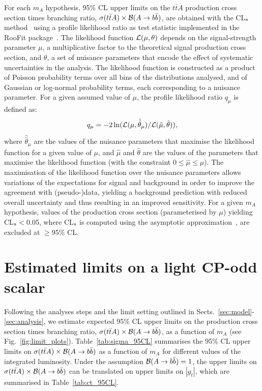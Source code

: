 \documentclass[preprintnumbers,superscriptaddress,nofootinbib,aps,prd,floatfix]{revtex4}
\newcommand{\ttbar}{\ensuremath{t\bar{t}}}
\begin{document}
For each $m_A$ hypothesis, 95\% CL upper limits on the $\ttbar A$ production cross section times branching ratio, 
$\sigma(\ttbar A) \times {\cal B}(A \to b\bar{b})$, are obtained with the CL$_{\rm{s}}$ method~\cite{Junk:1999kv,Read:2002hq} 
using a profile likelihood ratio as test statistic implemented in the {\sc RooFit} package~\cite{Verkerke:2003ir,RooFitManual}. 
The likelihood function ${\cal L}(\mu,\theta)$ depends on 
the signal-strength parameter $\mu$,  a multiplicative factor to the theoretical signal production cross section,
and $\theta$, a set of nuisance parameters that encode the effect of systematic uncertainties in the analysis.
The likelihood function is constructed as a product of Poisson probability terms over all bins of the distributions analysed, 
and of Gaussian or log-normal probability terms, each corresponding to a nuisance parameter. 
For a given assumed value of $\mu$, the profile likelihood ratio $q_\mu$ is defined as:
\begin{equation}
q_\mu = -2\ln({\cal L}(\mu,\hat{\hat{\theta}}_\mu)/{\cal L}(\hat{\mu},\hat{\theta})), 
\end{equation}
where $\hat{\hat{\theta}}_\mu$ are the values of the nuisance parameters that maximise the likelihood 
function for a given value of $\mu$, and $\hat{\mu}$ and $\hat{\theta}$ are the values of the parameters 
that maximise the likelihood function (with the constraint $0\leq \hat{\mu} \leq \mu$).
The maximisation of the likelihood function over the nuisance parameters allows variations of the expectations 
for signal and background in order to improve the agreement with (pseudo-)data, yielding a
background prediction with reduced overall uncertainty and thus resulting in an improved sensitivity.
For a given $m_A$ hypothesis, values of the production cross section (parameterised by $\mu$) yielding 
CL$_{\rm{s}}$$<$0.05, where CL$_{\rm{s}}$ is computed using the asymptotic 
approximation~\cite{Cowan:2010js}, are excluded at $\geq$95\% CL.


\section{Estimated limits on a light CP-odd scalar}
\label{sec:limit}

Following the analyses steps and the limit setting outlined in Sects.~\ref{sec:model}-\ref{sec:analysis}, we estimate expected 95\% CL upper limits
on the production cross section times branching ratio, $\sigma(\ttbar A) \times {\cal B}(A\to b\bar{b})$, as a function of $m_A$ (see Fig.~\ref{fig:limit_plots}).
Table~\ref{tab:sigma_95CL} summarises the 95\% CL upper limits on $\sigma(\ttbar A) \times {\cal B}(A\to b\bar{b})$ as a function of $m_A$ for different values
of the integrated luminosity. Under the assumption ${\cal B}(A\to b\bar{b})=1$, the upper limits on $\sigma(\ttbar A) \times {\cal B}(A\to b\bar{b})$ 
can be translated on upper limits on $|g_t|$, which are summarised in Table~\ref{tab:ct_95CL}.
\end{document}

